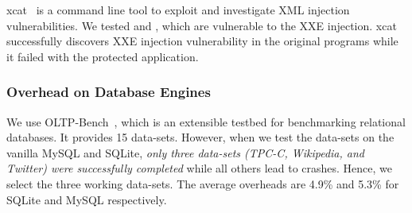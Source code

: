 xcat~\cite{xcat} is a command line tool to exploit and investigate XML injection vulnerabilities. We tested  and , which are vulnerable to the XXE injection. 
%
%
xcat successfully discovers XXE injection vulnerability in the original programs while it failed with the \sysname protected application.




\subsubsection{Overhead on Database Engines}
\label{appendix:overhead_database_engines}

We use OLTP-Bench~\cite{difallah2013oltp}, which is an extensible testbed for benchmarking relational databases. 
It provides 15 data-sets. However, when we test the data-sets on the vanilla MySQL and SQLite, \emph{only three data-sets (TPC-C, Wikipedia, and Twitter) were successfully completed} while all others lead to crashes. 
Hence, we select the three working data-sets.
The average overheads are 4.9\% and 5.3\% for SQLite and MySQL respectively. %

